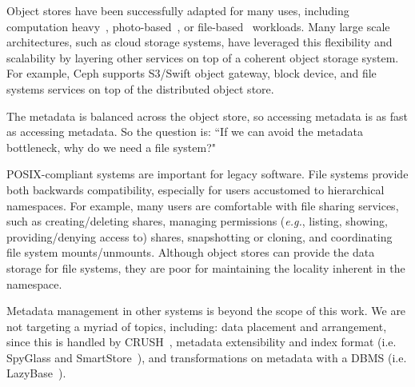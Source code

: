 Object stores have been successfully adapted for many uses, including computation heavy~\cite{nightingale:osdi2012-fds}, photo-based~\cite{beaver:osdi2010-haystack}, or file-based~\cite{weil:osdi2006-ceph,sinnamohideen:atc2010-ursa} workloads. Many large scale architectures, such as cloud storage systems, have leveraged this flexibility and scalability by layering other services on top of a coherent object storage system. For example, Ceph supports S3/Swift object gateway, block device, and file systems services on top of the distributed object store. 

The metadata is balanced across the object store, so accessing metadata is as fast as accessing metadata. So the question is: ``If we can avoid the metadata bottleneck, why do we need a file system?" 

POSIX-compliant systems are important for legacy software. File systems provide both backwards compatibility, especially for users accustomed to hierarchical namespaces. For example, many users are comfortable with file sharing services, such as creating/deleting shares, managing permissions ({\it e.g.}, listing, showing, providing/denying access to) shares, snapshotting or cloning, and coordinating file system mounts/unmounts. Although object stores can provide the data storage for file systems, they are poor for maintaining the locality inherent in the namespace.

Metadata management in other systems is beyond the scope of this work. We are not targeting a myriad of topics, including: data placement and arrangement, since this is handled by CRUSH~\cite{weil:osdi2006-ceph}, metadata extensibility and index format (i.e. SpyGlass\cite{leung:fast2009-spyglass} and SmartStore~\cite{hua:sc2009-smartstore}), and transformations on metadata with a DBMS (i.e. LazyBase~\cite{cipar:eurosys2012-lazybase}). 



